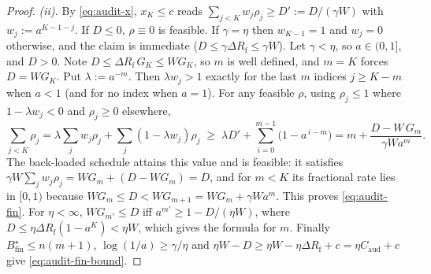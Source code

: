 \begin{proof}
\emph{(ii).} By \eqref{eq:audit-x}, $x_K\le c$ reads
$\sum_{j<K}w_j\rho_j\ge D':=D/(\gamma W)$ with $w_j:=a^{K-1-j}$. If $D\le0$,
$\rho\equiv0$ is feasible. If $\gamma=\eta$ then $w_{K-1}=1$ and $w_j=0$
otherwise, and the claim is immediate ($D\le\gamma\Delta R_{\mathrm f}\le\gamma W$). Let
$\gamma<\eta$, so $a\in(0,1]$, and $D>0$. Note $D\le\Delta R_{\mathrm f}\,G_K\le W G_K$, so
$m$ is well defined, and $m=K$ forces $D=WG_K$. Put $\lambda:=a^{-m}$. Then
$\lambda w_j>1$ exactly for the last $m$ indices $j\ge K-m$ when $a<1$ (and for
no index when $a=1$). For any feasible $\rho$, using $\rho_j\le1$ where
$1-\lambda w_j<0$ and $\rho_j\ge0$ elsewhere,
\[
 \sum_{j<K}\rho_j=\lambda\sum_j w_j\rho_j+\sum_j(1-\lambda w_j)\rho_j
 \;\ge\;\lambda D'+\sum_{i=0}^{m-1}\bigl(1-a^{\,i-m}\bigr)
 = m+\frac{D-W\,G_m}{\gamma W a^m}.
\]
The back-loaded schedule attains this value and is feasible: it satisfies
$\gamma W\sum_jw_j\rho_j=WG_m+(D-WG_m)=D$, and for $m<K$ its fractional rate lies
in $[0,1)$ because $WG_m\le D<WG_{m+1}=WG_m+\gamma Wa^m$. This proves
\eqref{eq:audit-fin}. For $\eta<\infty$, $WG_{m'}\le D$ iff
$a^{m'}\ge1-D/(\eta W)$, where $D\le\eta\Delta R_{\mathrm f}(1-a^K)<\eta W$, which gives the
formula for $m$. Finally $B^\star_{\mathrm{fin}}\le n(m+1)$,
$\log(1/a)\ge\gamma/\eta$ and $\eta W-D\ge\eta W-\eta\Delta R_{\mathrm f}+c=\eta C_{\mathrm{aud}}+c$ give
\eqref{eq:audit-fin-bound}.
\end{proof}

